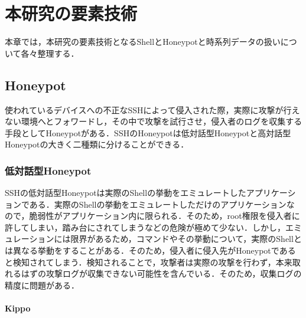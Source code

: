\chapter{本研究の要素技術}
\label{tech}

本章では，本研究の要素技術となるShellとHoneypotと時系列データの扱いについて各々整理する．

\section{Honeypot}

使われているデバイスへの不正なSSHによって侵入された際，実際に攻撃が行えない環境へとフォワードし，その中で攻撃を試行させ，侵入者のログを収集する手段としてHoneypotがある．SSHのHoneypot\cite{honeypot}は低対話型Honeypotと高対話型Honeypotの大きく二種類に分けることができる．\\


\subsection{低対話型Honeypot}
\label{tech:LowInteractionHoneypot}

SSHの低対話型Honeypotは実際のShellの挙動をエミュレートしたアプリケーションである．実際のShellの挙動をエミュレートしただけのアプリケーションなので，脆弱性がアプリケーション内に限られる．そのため，root権限を侵入者に許してしまい，踏み台にされてしまうなどの危険が極めて少ない．しかし，エミュレーションには限界があるため，コマンドやその挙動について，実際のShellとは異なる挙動をすることがある．そのため，侵入者に侵入先がHoneypotであると検知されてしまう．検知されることで，攻撃者は実際の攻撃を行わず，本来取れるはずの攻撃ログが収集できない可能性を含んでいる．そのため，収集ログの精度に問題がある．

\subsubsection{Kippo}
\label{tech:Kippo}

